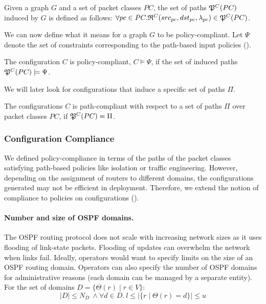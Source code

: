 \begin{definition}
Given a graph $G$ and a set of packet classes $PC$, the set of paths
$\mathfrak{P}^C(PC)$ induced by $G$ is defined as follows: 
$\forall pc \in PC. \mathfrak{R}^C(src_{pc}, dst_{pc}, \lambda_{pc}) \in \mathfrak{P}^C(PC)$.
\end{definition}

\noindent We can now define what it means for a graph $G$ to be policy-compliant. Let 
$\Psi$ denote the set of constraints corresponding to the 
path-based input policies (). 
\begin{definition}
	The configuration $C$ is policy-compliant,
	$C \models \Psi$, if the set of
	induced paths $\mathfrak{P}^C(PC) \models \Psi$.
\end{definition}

We will later look for configurations that induce a specific set of paths $\Pi$.  
\begin{definition}
	The configurations $C$ is path-compliant with respect to 
	a set of paths $\Pi$ over packet classes $PC$,
	if $\mathfrak{P}^C(PC)=\Pi$.
\end{definition}

\subsubsection{Configuration Compliance}
We defined policy-compliance in terms of the 
paths of the packet classes satisfying path-based 
policies like isolation or traffic engineering. However,
depending on the assignment of routers to different domains,
the configurations generated may not be efficient
in deployment. Therefore, we extend the notion of 
compliance to policies on configurations 
().

\paragraph{Number and size of OSPF domains.} 
The OSPF routing protocol does not scale 
with increasing network sizes
as it uses
flooding of link-state packets. Flooding 
of updates can  
overwhelm the network when links fail. 
Ideally, operators would want to specify
limits on the size of an OSPF routing domain. 
Operators can also specify the number of OSPF domains
for administrative reasons (each domain can be
managed by a separate entity). For the  
set of domains $D = \{\Theta(r) \mid r \in V\}$:
\begin{equation}
	|D| \leq N_{D} ~\wedge \forall d \in D. ~l \leq |\{r \mid \Theta(r) = d\}| \leq u
\end{equation}

